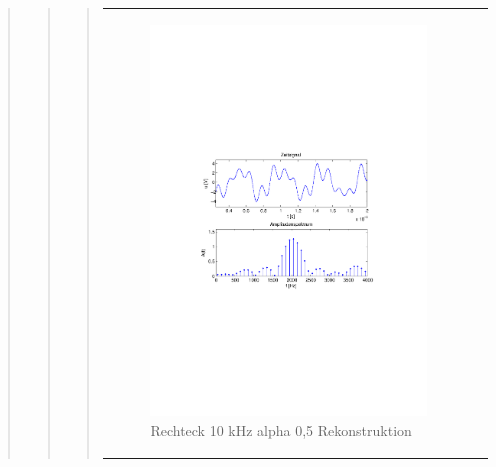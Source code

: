 \begin{quote}
\begin{quote}
\begin{quote}
\begin{center}
\begin{tabular}{ll}
            \hspace{-5cm}
                \begin{minipage}{0.6\textwidth}
                    \begin{figure}[H]
                        \includegraphics[scale=0.7, trim = 35mm 100mm 35mm 95mm, clip]{Bilder/shaperec10_05}
                          \caption{Rechteck 10 kHz alpha 0,5 Rekonstruktion}
		                  \label{fig:shaperec10_05}
                    \end{figure}
                \end{minipage}
                

\end{tabular}
\end{center}
\end{quote}
\end{quote}
\end{quote}
